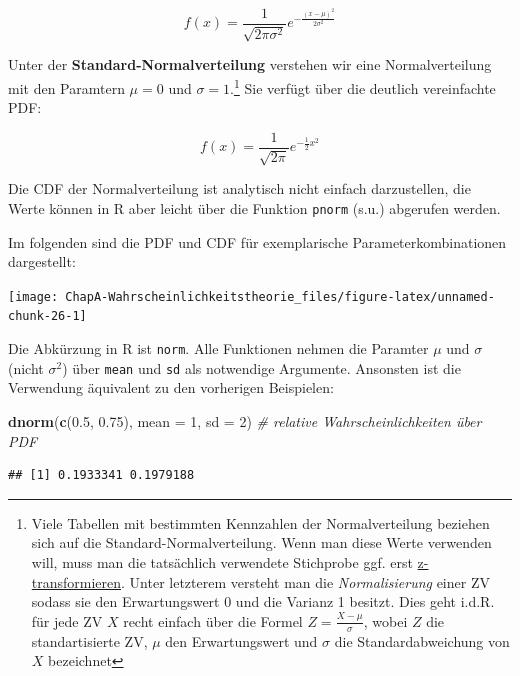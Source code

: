 \documentclass[]{book}
\newenvironment{Shaded}{\begin{snugshade}}{\end{snugshade}}
\newcommand{\KeywordTok}[1]{\textcolor[rgb]{0.13,0.29,0.53}{\textbf{#1}}}
\newcommand{\DataTypeTok}[1]{\textcolor[rgb]{0.13,0.29,0.53}{#1}}
\newcommand{\DecValTok}[1]{\textcolor[rgb]{0.00,0.00,0.81}{#1}}
\newcommand{\FloatTok}[1]{\textcolor[rgb]{0.00,0.00,0.81}{#1}}
\newcommand{\CommentTok}[1]{\textcolor[rgb]{0.56,0.35,0.01}{\textit{#1}}}
\newcommand{\NormalTok}[1]{#1}
\let\rmarkdownfootnote\footnote%
\def\footnote{\protect\rmarkdownfootnote}
\begin{document}
\[f(x)=\frac{1}{\sqrt{2\pi\sigma^2}}e^{-\frac{(x-\mu)^2}{2\sigma^2}} \]

Unter der \textbf{Standard-Normalverteilung} verstehen wir eine
Normalverteilung mit den Paramtern \(\mu=0\) und \(\sigma=1\).\footnote{Viele
  Tabellen mit bestimmten Kennzahlen der Normalverteilung beziehen sich
  auf die Standard-Normalverteilung. Wenn man diese Werte verwenden
  will, muss man die tatsächlich verwendete Stichprobe ggf. erst
  \href{https://de.wikipedia.org/wiki/Standardisierung_(Statistik)}{z-transformieren}.
  Unter letzterem versteht man die \emph{Normalisierung} einer ZV sodass
  sie den Erwartungswert 0 und die Varianz 1 besitzt. Dies geht i.d.R.
  für jede ZV \(X\) recht einfach über die Formel
  \(Z=\frac{X-\mu}{\sigma}\), wobei \(Z\) die standartisierte ZV,
  \(\mu\) den Erwartungswert und \(\sigma\) die Standardabweichung von
  \(X\) bezeichnet} Sie verfügt über die deutlich vereinfachte PDF:

\[f(x)=\frac{1}{\sqrt{2\pi}}e^{-\frac{1}{2}x^2}\]

Die CDF der Normalverteilung ist analytisch nicht einfach darzustellen,
die Werte können in R aber leicht über die Funktion \texttt{pnorm}
(s.u.) abgerufen werden.

Im folgenden sind die PDF und CDF für exemplarische
Parameterkombinationen dargestellt:

\begin{center}\texttt{[image: ChapA-Wahrscheinlichkeitstheorie\_files/figure-latex/unnamed-chunk-26-1]} \end{center}

Die Abkürzung in R ist \texttt{norm}. Alle Funktionen nehmen die
Paramter \(\mu\) und \(\sigma\) (nicht \(\sigma^2\)) über \texttt{mean}
und \texttt{sd} als notwendige Argumente. Ansonsten ist die Verwendung
äquivalent zu den vorherigen Beispielen:

\begin{Shaded}
\begin{Highlighting}[]
\KeywordTok{dnorm}\NormalTok{(}\KeywordTok{c}\NormalTok{(}\FloatTok{0.5}\NormalTok{, }\FloatTok{0.75}\NormalTok{), }\DataTypeTok{mean =} \DecValTok{1}\NormalTok{, }\DataTypeTok{sd =} \DecValTok{2}\NormalTok{) }\CommentTok{# relative Wahrscheinlichkeiten über PDF}
\end{Highlighting}
\end{Shaded}

\begin{verbatim}
## [1] 0.1933341 0.1979188
\end{verbatim}
\end{document}
